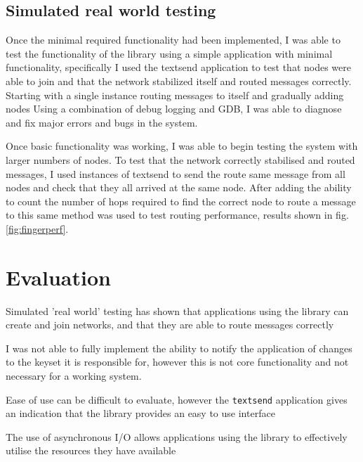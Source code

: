 \documentclass{article}
\begin{document}
\subsection{Simulated real world testing}

Once the minimal required functionality had been implemented, I was able to test the functionality of the library using a simple application with minimal functionality, specifically I used the textsend application to test that nodes were able to join and that the network stabilized itself and routed messages correctly. Starting with a single instance routing messages to itself and gradually adding nodes Using a combination of debug logging and GDB, I was able to diagnose and fix major errors and bugs in the system.

Once basic functionality was working, I was able to begin testing the system with larger numbers of nodes. To test that the network correctly stabilised and routed messages, I used instances of textsend to send the route same message from all nodes and check that they all arrived at the same node. After adding the ability to count the number of hops required to find the correct node to route a message to this same method was used to test routing performance, results shown in fig. \ref{fig:fingerperf}.

\section{Evaluation}


Simulated 'real world' testing has shown that applications using the library can create and join networks, and that they are able to route messages correctly

I was not able to fully implement the ability to notify the application of changes to the keyset it is responsible for, however this is not core functionality and not necessary for a working system.

Ease of use can be difficult to evaluate, however the \texttt{textsend} application gives an indication that the library provides an easy to use interface

The use of asynchronous I/O allows applications using the library to effectively utilise the resources they have available
\end{document}
